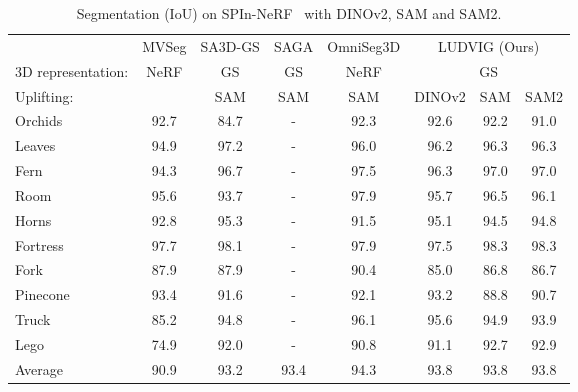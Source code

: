 \begin{table}[t!]
  \centering
  \footnotesize
\begin{tabular}{lccccccc}
\toprule
& \multirow{1}{*}{MVSeg} & \multirow{1}{*}{SA3D-GS} & \multirow{1}{*}{SAGA} & \multirow{1}{*}{OmniSeg3D} & \multicolumn{3}{c}{LUDVIG (Ours)}  \\
\cmidrule(lr){6-8}
3D representation: & NeRF & GS & GS & NeRF &  \multicolumn{3}{c}{GS} \\
Uplifting: &  & SAM & SAM & SAM & DINOv2 & SAM & SAM2 \\
\midrule
Orchids      & 92.7 & 84.7 & - & 92.3 & 92.6 & 92.2 & 91.0 \\
Leaves  & 94.9 & 97.2  & - & 96.0  & 96.2 & 96.3 & 96.3 \\
Fern & 94.3 & 96.7 & - & 97.5 & 96.3 & 97.0 & 97.0 \\
Room   & 95.6 & 93.7 & - & 97.9 & 95.7 & 96.5 & 96.1 \\
Horns  & 92.8 & 95.3 & - & 91.5 & 95.1 & 94.5 & 94.8 \\
Fortress   & 97.7 & 98.1 & - & 97.9  & 97.5 & 98.3 & 98.3 \\
\midrule
Fork   & 87.9 & 87.9 & - & 90.4 & 85.0 & 86.8 & 86.7 \\
Pinecone   & 93.4 & 91.6 & - & 92.1 & 93.2 & 88.8 & 90.7  \\
Truck   & 85.2 & 94.8 & - & 96.1 & 95.6 & 94.9 & 93.9 \\
Lego   & 74.9 & 92.0 & - & 90.8 & 91.1 & 92.7 & 92.9 \\
\midrule
Average  & 90.9 &  93.2  & 93.4 & 94.3 & 93.8 & 93.8 & 93.8 \\
\hline
\end{tabular}
  \caption{Segmentation (IoU) on SPIn-NeRF~\citep{mirzaei2023spin} with DINOv2, SAM and SAM2.}
  \label{tab:spin}
\end{table}